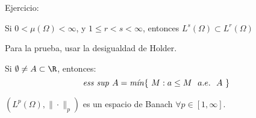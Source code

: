 Ejercicio:
\begin{nprop}
  Si $0 < \mu(\Omega) < \infty$, y $1\leq r < s < \infty $, entonces $L^s(\Omega) \subset L^r(\Omega)$
\end{nprop}
\begin{nota}
  Para la prueba, usar la desigualdad de Holder.
\end{nota}

\begin{ndef}
  Si $\emptyset \ne A \subset \R$, entonces:
  \[
    \text{\textit{ess sup }} A = \text{\textit{mín}}\{ \ M : a \leq M \ \ a.e. \ \ A \ \}
  \]
\end{ndef}

\begin{nth}
  $( L^p(\Omega), \| \cdot \|_p)$ es un espacio de Banach $\forall p \in [1,\infty]$.
\end{nth}
